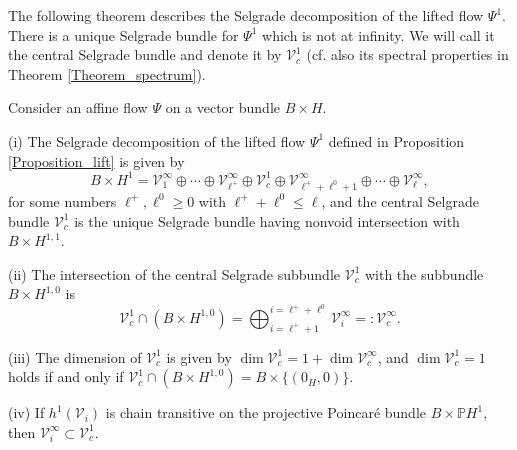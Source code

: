 	The following theorem describes the Selgrade decomposition of the lifted flow
	$\Psi^{1}$. There is a unique Selgrade bundle for $\Psi^{1}$ which is not at
	infinity. We will call it the central Selgrade bundle and denote it by
	$\mathcal{V}_{c}^{1}$ (cf. also its spectral properties in Theorem
	\ref{Theorem_spectrum}).
	
	\begin{theorem}
		\label{Theorem_affine1}Consider an affine flow $\Psi$ on a vector bundle
		$B\times H$.
		
		(i) The Selgrade decomposition of the lifted flow $\Psi^{1}$ defined in
		Proposition \ref{Proposition_lift} is given by
		\begin{equation}
			B\times H^{1}=\mathcal{V}_{1}^{\infty}\oplus\cdots\oplus\mathcal{V}_{\ell^{+}%
			}^{\infty}\oplus\mathcal{V}_{c}^{1}\oplus\mathcal{V}_{\ell^{+}+\ell^{0}%
				+1}^{\infty}\oplus\cdots\oplus\mathcal{V}_{\ell}^{\infty}, \label{Sel1}%
		\end{equation}
		for some numbers $\ell^{+},\ell^{0}\geq0$ with $\ell^{+}+\ell^{0}\leq\ell$,
		and the central Selgrade bundle $\mathcal{V}_{c}^{1}$ is the unique Selgrade
		bundle having nonvoid intersection with $B\times H^{1,1}$.
		
		(ii) The intersection of the central Selgrade subbundle $\mathcal{V}_{c}^{1}$
		with the subbundle $B\times H^{1,0}$ is%
		\[
		\mathcal{V}_{c}^{1}\cap\left(  B\times H^{1,0}\right)  =\bigoplus_{i=\ell
			^{+}+1}^{i=\ell^{+}+\ell^{0}}\mathcal{V}_{i}^{\infty}=:\mathcal{V}_{c}%
		^{\infty}.
		\]
		
		
		(iii) The dimension of $\mathcal{V}_{c}^{1}$ is given by $\dim\mathcal{V}%
		_{c}^{1}=1+\dim\mathcal{V}_{c}^{\infty}$, and $\dim\mathcal{V}_{c}^{1}=1$
		holds if and only if $\mathcal{V}_{c}^{1}\cap\left(  B\times H^{1,0}\right)
		=B\times\{(0_{H},0)\}$.
		
		(iv) If $h^{1}(\mathcal{V}_{i})$ is chain transitive on the projective
		Poincar\'{e} bundle $B\times\mathbb{P}H^{1}$, then $\mathcal{V}_{i}^{\infty
		}\subset\mathcal{V}_{c}^{1}$.
	\end{theorem}
	
